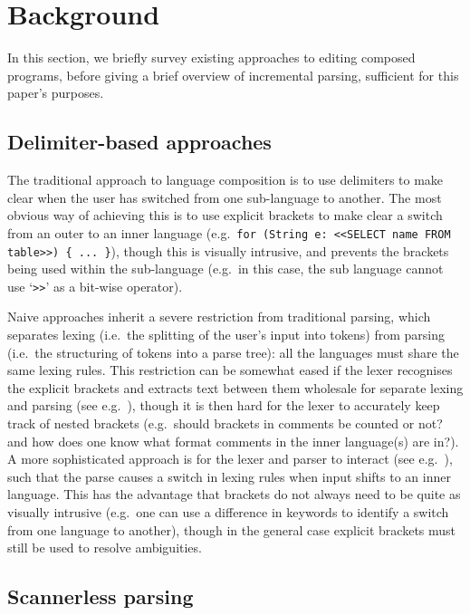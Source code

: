 \documentclass[sigplan,screen]{acmart}\settopmatter{printfolios=true,printccs=false,printacmref=false}
\begin{document}
\section{Background}
\label{sec_background}

In this section, we briefly survey existing approaches to editing composed
programs, before giving a brief overview of incremental parsing, sufficient for
this paper's purposes.


\subsection{Delimiter-based approaches}

The traditional approach to language composition is to use delimiters
to make clear when the user has switched from one sub-language to another. The
most obvious way of achieving this is to use explicit brackets to make clear a
switch from an outer to an inner language (e.g.~\texttt{for (String e: <<SELECT name
FROM table>>) \{ ... \}}), though this is visually intrusive, and prevents the
brackets being used within the sub-language (e.g.~in this case, the sub language
cannot use `\texttt{>>}' as a bit-wise operator).

Naive approaches inherit a severe restriction from traditional parsing, which
separates lexing (i.e.~the splitting of the user's input into tokens) from
parsing (i.e.~the structuring of tokens into a parse tree): all the languages
must share the same lexing rules. This restriction can be somewhat eased if the
lexer recognises the explicit brackets and extracts text between them wholesale
for separate lexing and parsing (see e.g.~\cite[p.~13-14]{tratt08domainspecific}),
though it is then hard for the lexer to accurately keep track of nested
brackets (e.g.~should brackets in comments be counted or not? and how does
one know what format comments in the inner language(s) are in?).  A
more sophisticated approach is for the lexer and parser to interact (see
e.g.~\cite{wyk07context}), such that the parse causes a switch in lexing rules
when input shifts to an inner language.
This has the advantage that brackets do not always need to be quite as visually
intrusive (e.g.~one can use a difference in keywords to identify a switch from
one language to another), though in the general case explicit brackets must still be
used to resolve ambiguities.


\subsection{Scannerless parsing}
\label{sec:scannerless}
\end{document}
